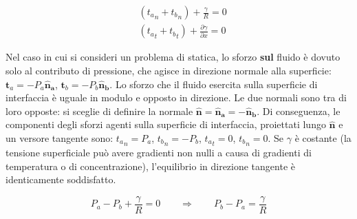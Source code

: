\begin{equation}\label{eqn:equil_young_laplace}
\begin{aligned}
 & ( {t_a}_n + {t_b}_n ) + \frac{\gamma}{R} = 0 \\
 & ( {t_a}_t + {t_b}_t ) + \frac{\partial \gamma}{\partial x} = 0
\end{aligned}
\end{equation}

Nel caso in cui si consideri un problema di statica, lo sforzo \textbf{sul} 
 fluido è dovuto solo al contributo di pressione, che agisce in direzione
 normale alla superficie: 
 $\bm{t}_a = -P_a \bm{\hat{n}_a}$,  $\bm{t}_b = -P_b \bm{\hat{n}_b}$. Lo
 sforzo che il fluido esercita sulla superficie di interfaccia è uguale
 in modulo e opposto in direzione. Le due
  normali sono tra di loro opposte: si sceglie di definire la normale
  $\bm{\hat{n}} = \bm{\hat{n}_a} = -\bm{\hat{n}_b}$. Di conseguenza, le
  componenti degli sforzi agenti sulla superficie di interfaccia, proiettati
  lungo $\bm{\hat{n}}$ e un versore tangente sono: ${{t_a}_n} = P_a$, 
  ${{t_b}_n} = - P_b$, ${{t_a}_t} = 0$, ${{t_b}_n} = 0$.
 Se $\gamma$ è costante (la tensione superficiale può avere gradienti non 
 nulli a causa di gradienti di temperatura o di concentrazione),
  l'equilibrio in direzione tangente è identicamente soddisfatto.

\begin{equation}
   P_a - P_b + \frac{\gamma}{R} = 0 \qquad 
  \Rightarrow  \qquad 
   P_b - P_a = \frac{\gamma}{R}
\end{equation}

